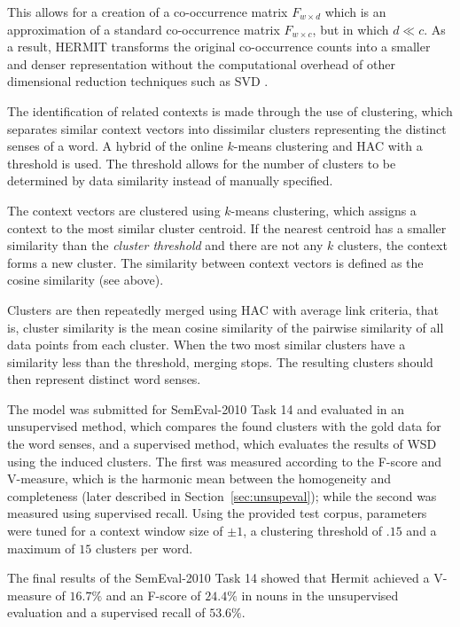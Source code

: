 This allows for a creation of a co-occurrence matrix $F_{w \times d}$ which is
an approximation of a standard co-occurrence matrix $F_{w \times c}$, but in
which $d \ll c$. As a result, HERMIT transforms the original co-occurrence 
counts into a smaller and denser representation without the computational 
overhead of other dimensional reduction techniques such as \ac{SVD} 
\citep{jurgens2010hermit}.

The identification of related contexts is made through the use of clustering, 
which separates similar context vectors into dissimilar clusters representing 
the distinct senses of a word. A hybrid of the online $k$-means clustering 
\citep{liberty2016algorithm} and \ac{HAC} \citep{zepeda2013hierarchical} with a 
threshold is used. The threshold allows for the number of clusters to be 
determined by data similarity instead of manually specified.

The context vectors are clustered using $k$-means clustering, which assigns a 
context to the most similar cluster centroid. If the nearest centroid has a 
smaller similarity than the \textit{cluster threshold} and there are not any 
$k$ clusters, the context forms a new cluster. The similarity between context 
vectors is defined as the cosine similarity (see above).

Clusters are then repeatedly merged using \ac{HAC} with average link criteria,
that is, cluster similarity is the mean cosine similarity of the pairwise
similarity of all data points from each cluster. When the two most similar
clusters have a similarity less than the threshold, merging stops. The resulting
clusters should then represent distinct word senses.

The model was submitted for SemEval-2010 Task 14 \citep{manandhar2009semeval}
and evaluated in an unsupervised method, which compares the found clusters with 
the gold data for the word senses, and a supervised method, which evaluates the 
results of \ac{WSD} using the induced clusters. The first was measured
according to the F-score and V-measure, which is the harmonic mean between the 
homogeneity and completeness (later described in Section~\ref{sec:unsupeval}); 
while the second was measured using supervised recall. Using the provided test 
corpus, parameters were tuned for a context window size of $\pm1$, a clustering
threshold of $.15$ and a maximum of $15$ clusters per word.

The final results of the SemEval-2010 Task 14 showed that Hermit achieved a
V-measure of $16.7\%$ and an F-score of $24.4\%$ in nouns in the unsupervised
evaluation and a supervised recall of $53.6\%$.


